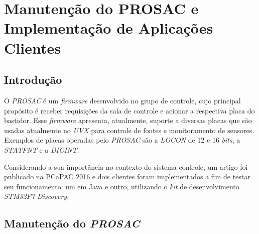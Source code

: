 \section {Manutenção do PROSAC e Implementação de Aplicações Clientes}

\subsection{Introdução}

O \textit{PROSAC} é um \textit{firmware} desenvolvido no grupo de controle, cujo
principal propósito é receber requisições da sala de controle e acionar a
respectiva placa do bastidor. Esse \textit{firmware} apresenta, atualmente,
suporte a diversas placas que são usadas atualmente no \textit{UVX} para
controle de fontes e monitoramento de sensores. Exemplos de placas operadas pelo
\textit{PROSAC} são a \textit{LOCON} de 12 e 16 \textit{bits}, a
\textit{STATFNT} e a \textit{DIGINT}.

\vspace{12px}

Considerando a sua importância no contexto do sistema controle, um artigo
foi publicado na PCaPAC 2016 \cite{pcapac2016} e dois clientes foram
implementados a fim de testar seu funcionamento: um em Java e outro, utilizando o \textit{kit} de
desenvolvimento \textit{STM32F7 Discovery}.

\subsection {Manutenção do \textit{PROSAC}}

